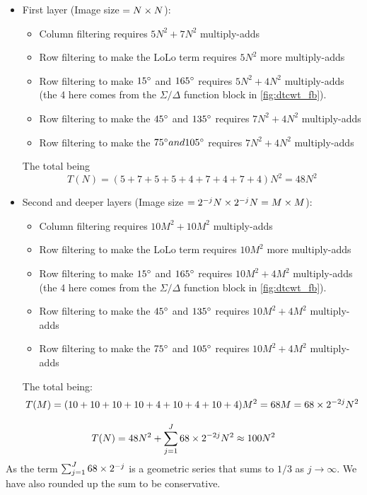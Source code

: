   \begin{itemize}
    \item First layer (Image size $=N\times N$):
      \begin{itemize}
        \item Column filtering requires $5N^2+7N^2$ multiply-adds
        \item Row filtering to make the LoLo term requires $5N^2$ more
          multiply-adds
        \item Row filtering to make $15{^{\circ}}$ and $165{^{\circ}}$ requires
          $5N^2+4N^2$
          multiply-adds (the 4 here comes from the $\Sigma/\Delta$ function
          block in \autoref{fig:dtcwt_fb}).
        \item Row filtering to make the $45{^{\circ}}$ and $135{^{\circ}}$ requires $7N^2
          +4N^2$ multiply-adds
        \item Row filtering to make the $75{^{\circ}} and 105{^{\circ}}$ requires
          $7N^2+4N^2$
          multiply-adds
      \end{itemize}
      The total being 
      $$T(N) = (5+7+5+5+4+7+4+7+4)N^2 = 48N^2$$
    \item Second and deeper layers (Image size $=2^{-j}N\times 2^{-j}N=M\times M$):
      \begin{itemize}
        \item Column filtering requires $10M^2+10M^2$ multiply-adds
        \item Row filtering to make the LoLo term requires $10M^2$ more
          multiply-adds
        \item Row filtering to make $15{^{\circ}}$ and $165{^{\circ}}$ requires
          $10M^2+4M^2$
          multiply-adds (the 4 here comes from the $\Sigma/\Delta$ function
          block in \autoref{fig:dtcwt_fb}).
        \item Row filtering to make the $45{^{\circ}}$ and $135{^{\circ}}$ requires
          $10M^2 +4M^2$ multiply-adds
        \item Row filtering to make the $75{^{\circ}}$ and $105{^{\circ}}$ requires
          $10M^2+4M^2$
          multiply-adds
      \end{itemize}
      The total being: 
      $$T(M) = (10+10+10+10+4+10+4+10+4)M^2 = 68M = 68\times 2^{-2j}N^2$$
  \end{itemize}
  \begin{equation}
    T(N) = 48N^2 + \sum_{j=1}^{J} 68 \times 2^{-2j}N^2 \approx 100N^2
  \end{equation}
  As the term $\sum_{j=1}^{J} 68 \times 2^{-j}$ is a geometric series that sums to
  $1/3$ as $j \rightarrow \infty$. We have also rounded up the sum to be conservative.

